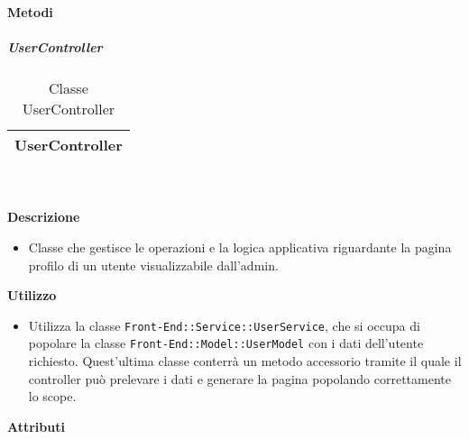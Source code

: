 		\textbf{Metodi} 
	\begin{itemize}
		\end{itemize}
			\subparagraph{UserController} 
\begin{table}[ht]
\begin{center}
\bgroup
	\setlength{\arrayrulewidth}{0.6mm}
	\def\arraystretch{1}
		\begin{tabular}{ | p{12cm} | }
				\hline  
					\centerline{\textbf{UserController}}
		\\ \hline 
				\hline
				\hline
		
		\end{tabular}
\egroup
\caption{Classe UserController}
\end{center}
\end{table}  \textbf{\\ \\ Descrizione} 
					\begin{itemize}
						\item[] Classe che gestisce le operazioni e la logica applicativa riguardante la pagina profilo di un utente visualizzabile dall'admin.
					\end{itemize}      
				\textbf{Utilizzo}  
					\begin{itemize}
						\item[] Utilizza la classe \texttt{Front-End::Service::UserService}, che si occupa di popolare la classe \texttt{Front-End::Model::UserModel} con i dati dell'utente richiesto. Quest'ultima classe conterrà un metodo accessorio tramite il quale il controller può prelevare i dati e generare la pagina popolando correttamente lo scope.
					\end{itemize}
			 \textbf{Attributi} 
	\begin{itemize}
		\end{itemize}
		

